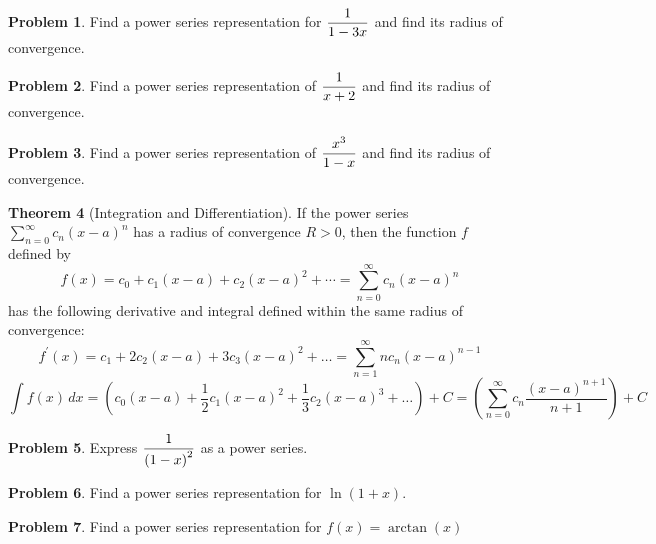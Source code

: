 \documentclass[letterpaper, twoside, 12pt]{book}
\theoremstyle{definition}
\newtheorem{theorem}{Theorem}
\theoremstyle{definition}
\newtheorem{problem}[theorem]{Problem}
\newcommand{\ds}{\ensuremath{\displaystyle}}
\begin{document}
\vfill

\begin{problem}
 Find a power series representation for $\ds \frac{1}{1-3x}$ and find its
 radius of convergence.
\end{problem}

\vfill

\newpage

\begin{problem}
 Find a power series representation of $\ds \frac{1}{x+2}$ and find
 its radius of convergence.
\end{problem}

\vfill

\begin{problem}
 Find a power series representation of $\ds \frac{x^3}{1-x}$ and find
 its radius of convergence.
\end{problem}

\vfill

\newpage

\begin{theorem}[Integration and Differentiation]
 If the power series $\sum_{n=0}^{\infty} c_n\left(x-a\right)^n$ has a radius
 of convergence $R > 0$, then the function $f$ defined by
  \[
    f(x) = c_0 + c_1\left(x-a\right) + c_2\left(x-a\right)^2 + \cdots
         = \sum_{n=0}^{\infty} c_n\left(x-a\right)^n
  \]
 has the following derivative and integral defined within the same radius
 of convergence:
 \[
  f^\prime(x) = c_1 + 2c_2(x-a) + 3c_3(x-a)^2 + \dots
              = \sum_{n=1}^{\infty} nc_n\left(x-a\right)^{n-1}
 \]
 \[
  \int f(x) \, dx
   =
  \left(c_0(x-a) + \frac{1}{2}c_1(x-a)^2 + \frac{1}{3}c_2(x-a)^3+\dots \right) + C
   =
  \left(\sum_{n=0}^{\infty} c_n \frac{\left(x-a\right)^{n+1}}{n+1}\right) + C
 \]
\end{theorem}

\begin{problem}
 Express $\ds \frac{1}{\left(1-x\right)^2}$ as a power series.
\end{problem}

\vfill

\newpage

\begin{problem}
 Find a power series representation for $\ln\left(1+x\right)$.
\end{problem}

\vfill

\begin{problem}
 Find a power series representation for $f(x) = \arctan\left(x\right)$
\end{problem}
\end{document}

